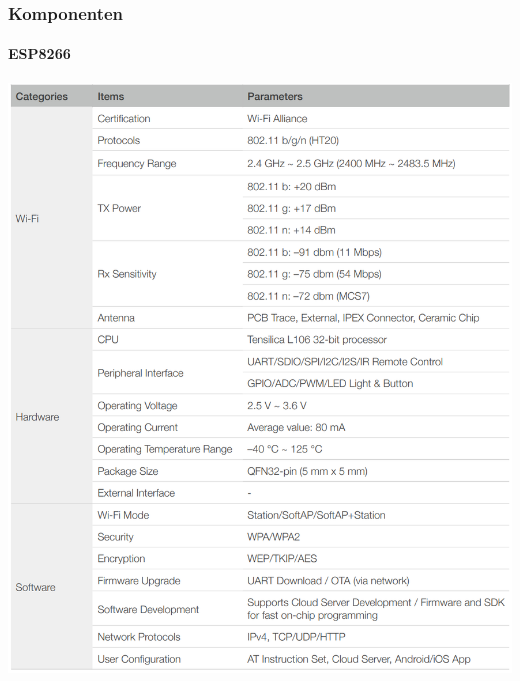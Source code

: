 \documentclass{beamer}
\begin{document}
\begin{frame}

	\frametitle{Komponenten}
	\framesubtitle{ESP8266}
	\begin{center}
		\includegraphics[scale=0.2125]{images/esp8266_peripherals.png}
	\end{center}

\end{frame}
\end{document}
